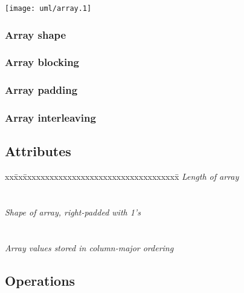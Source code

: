 \centerline{\texttt{[image: uml/array.1]}}

\subsubsection{Array shape}

\subsubsection{Array blocking}

\subsubsection{Array padding}

\subsubsection{Array interleaving}


\subsection{Attributes}

\begin{tabbing}
xx\=xx\=xxxxxxxxxxxxxxxxxxxxxxxxxxxxxxxxxxx\= \kill
\> \todo \>  \textit{Length of array} \\
\>       \>       \\ \\
\> \todo \>  \textit {Shape of array, right-padded with 1's} \\
\>       \>   \\ \\
\> \todo \>  \textit {Array values stored in column-major ordering}\\
\>       \> 
\end{tabbing}

\subsection{Operations}

